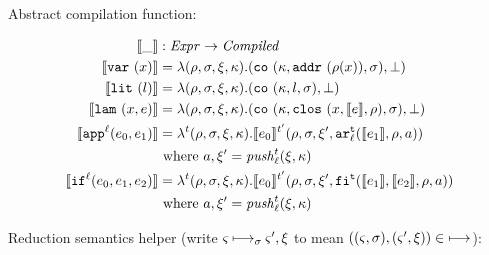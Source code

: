 \documentclass{llncs}
\begin{document}
Abstract compilation function:

\begin{align*}
\compile{\_} &: \Expr \to \Compiled \\
\compile{\svar\mvar} &= \lambda(\menv,\msto,\msdiff, \mkont) .
                          \ttuple{\co{\mkont, \spchoice{\saddr{\menv(\mvar)}}{\superposition{\msto(\menv(\mvar))}},\msto}}{\bot}
\\
\compile{\slit\mlit} &= \lambda(\menv,\msto,\msdiff,\mkont) .
\ttuple{\co{\mkont,\mlit,\msto}}{\bot}
\\
\compile{\slam\mvar\mexp} &= \lambda(\menv,\msto,\msdiff,\mkont) .
\ttuple{\co{\mkont,\clos{\mvar,\compile\mexp,\menv},\msto}}{\bot}
\\
\compile{\sapp[^\mlab]{\mexpi0}{\mexpi1}} &= \lambda^\mcntr (\menv,\msto,\msdiff,\mkont) .
\compile{\mexpi0}^{\mcntr'}(\menv,\msto,\msdiff',\kar[_\mlab^\mcntr]{\compile{\mexpi1},\menv,\maddr})
\\
&
\text{ where }\maddr,\msdiff' = \push^\mcntr_\mlab(\msdiff,\mkont)
\\
\compile{\sif[^\mlab]{\mexpi0}{\mexpi1}{\mexpi2}} &= \lambda^\mcntr(\menv,\msto,\msdiff,\mkont) .
\compile{\mexpi0}^{\mcntr'}(\menv,\msto,\msdiff',\kif[^\mcntr]{\compile{\mexpi1},\compile{\mexpi2},\menv,\maddr})
\\
&\text{ where }\maddr,\msdiff' = \push_\mlab^\mcntr(\msdiff,\mkont)
\end{align*}

Reduction semantics helper (write $\mstate \machstep_\msto \mstate',\msdiff$ to mean $((\mstate,\msto),(\mstate',\msdiff)) \in \machstep$):
\end{document}
